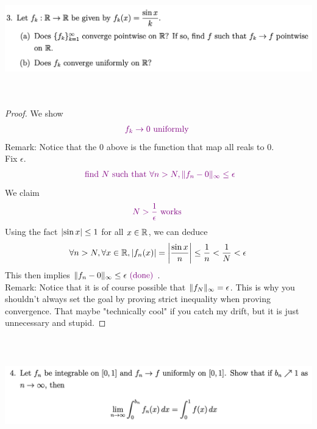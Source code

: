 \documentclass{report}
\begin{document}
\begin{question}{}{}
\includegraphics[height=5cm,width=18cm]{HW1.5}
\end{question}
\begin{proof}
We show 
\begin{align*}
\textcolor{violet}{f_k\to 0\text{ uniformly }}
\end{align*}
Remark: Notice that the $0$ above is the function that map all reals to $0$.\\

Fix $\epsilon $. 
\begin{align*}
\textcolor{violet}{\text{ find $N$ such that }\forall n>N, \| f_n-0 \|_\infty \leq \epsilon }
\end{align*}
We claim 
\begin{align*}
  \textcolor{violet}{N>\frac{1}{\epsilon }\text{ works }}
\end{align*}
Using the fact $\left|\sin x\right|\leq 1$ for all $x \in\mathbb{R}$, we can deduce 
\begin{align*}
\forall n>N, \forall x\in\mathbb{R}, \left|f_n(x)\right|=\left|\frac{\sin x}{n}\right|\leq \frac{1}{n}<\frac{1}{N}< \epsilon 
\end{align*}
This then implies $\| f_n-0 \|_{\infty}\leq \epsilon\textcolor{violet}{\text{ (done) }} $.\\

Remark: Notice that it is of course possible that $\| f_N \|_\infty=\epsilon $. This is why you shouldn't always set the goal by proving strict inequality when proving convergence. That maybe "technically cool" if you catch my drift, but it is just unnecessary and stupid. 
\end{proof}
\begin{question}{}{}
\includegraphics[height=5cm,width=18cm]{HW1.4}
\end{question}
\end{document}

